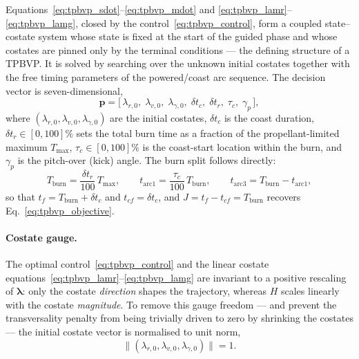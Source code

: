 Equations~\eqref{eq:tpbvp_sdot}--\eqref{eq:tpbvp_mdot} and
\eqref{eq:tpbvp_lamr}--\eqref{eq:tpbvp_lamg}, closed by the
control~\eqref{eq:tpbvp_control}, form a coupled state--costate system whose
state is fixed at the start of the guided phase and whose costates are pinned
only by the terminal conditions --- the defining structure of a TPBVP.  It is
solved by searching over the unknown initial costates together with the free
timing parameters of the powered/coast arc sequence.  The decision vector is
seven-dimensional,
\begin{equation}
  \mathbf{p} = \bigl[\,\lambda_{r,0},\;\lambda_{v,0},\;\lambda_{\gamma,0},\;
     \delta t_c,\; \delta t_{r},\; \tau_c,\; \gamma_p\,\bigr],
  \label{eq:tpbvp_decision}
\end{equation}
where $(\lambda_{r,0},\lambda_{v,0},\lambda_{\gamma,0})$ are the initial
costates, $\delta t_c$ is the coast duration, $\delta t_r \in [0,100]\%$ sets the
total burn time as a fraction of the propellant-limited maximum $T_{\max}$,
$\tau_c \in [0,100]\%$ is the coast-start location within the burn, and
$\gamma_p$ is the pitch-over (kick) angle.  The burn split follows directly:
\begin{equation}
  T_{\text{burn}} = \frac{\delta t_r}{100}\,T_{\max}, \qquad
  t_{\text{arc}1} = \frac{\tau_c}{100}\,T_{\text{burn}}, \qquad
  t_{\text{arc}3} = T_{\text{burn}} - t_{\text{arc}1},
  \label{eq:tpbvp_timing}
\end{equation}
so that $t_f = T_{\text{burn}} + \delta t_c$ and $t_{cf} = \delta t_c$, and
$J = t_f - t_{cf} = T_{\text{burn}}$ recovers Eq.~\eqref{eq:tpbvp_objective}.

\paragraph{Costate gauge.}
The optimal control~\eqref{eq:tpbvp_control} and the linear costate
equations~\eqref{eq:tpbvp_lamr}--\eqref{eq:tpbvp_lamg} are invariant to a
positive rescaling of $\boldsymbol\lambda$: only the costate \emph{direction}
shapes the trajectory, whereas $H$ scales linearly with the costate
\emph{magnitude}.  To remove this gauge freedom --- and prevent the
transversality penalty from being trivially driven to zero by shrinking the
costates --- the initial costate vector is normalised to unit norm,
\begin{equation}
  \lVert(\lambda_{r,0},\lambda_{v,0},\lambda_{\gamma,0})\rVert = 1.
  \label{eq:tpbvp_gauge}
\end{equation}

